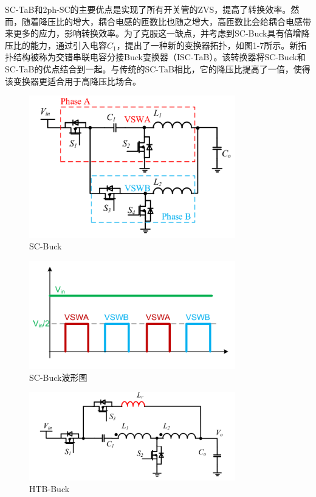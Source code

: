 SC-TaB和2ph-SC的主要优点是实现了所有开关管的ZVS，提高了转换效率。然而，随着降压比的增大，耦合电感的匝数比也随之增大，高匝数比会给耦合电感带来更多的应力，影响转换效率。为了克服这一缺点，并考虑到SC-Buck具有倍增降压比的能力，通过引入电容$C_1$，提出了一种新的变换器拓扑，如图1-7所示。新拓扑结构被称为交错串联电容分接Buck变换器（ISC-TaB）。该转换器将SC-Buck和SC-TaB的优点结合到一起。与传统的SC-TaB相比，它的降压比提高了一倍，使得该变换器更适合用于高降压比场合。
\begin{figure}[h]
    \centering
    \includegraphics[width = 0.8\textwidth]{figures/SC-Buck.png}
    \caption{SC-Buck}
\end{figure}
\begin{figure}[h]
    \centering
    \includegraphics[width = 0.8\textwidth]{figures/SC-Buck_v.png}
    \caption{SC-Buck波形图}
\end{figure}
\begin{figure}[h]
    \centering
    \includegraphics[width = 0.8\textwidth]{figures/HTB-Buck.png}
    \caption{HTB-Buck}
\end{figure}
